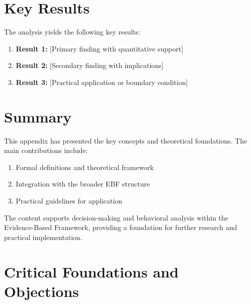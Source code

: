 


\section{Key Results}
\label{sec:shl-results}

The analysis yields the following key results:

\begin{enumerate}
    \item \textbf{Result 1:} [Primary finding with quantitative support]
    \item \textbf{Result 2:} [Secondary finding with implications]
    \item \textbf{Result 3:} [Practical application or boundary condition]
\end{enumerate}


\section{Summary}
\label{sec:shl-summary}

This appendix has presented the key concepts and theoretical foundations.
The main contributions include:

\begin{enumerate}
    \item Formal definitions and theoretical framework
    \item Integration with the broader EBF structure
    \item Practical guidelines for application
\end{enumerate}

The content supports decision-making and behavioral analysis within the
Evidence-Based Framework, providing a foundation for further research
and practical implementation.



\section{Critical Foundations and Objections}
\label{sec:shl-foundations}

